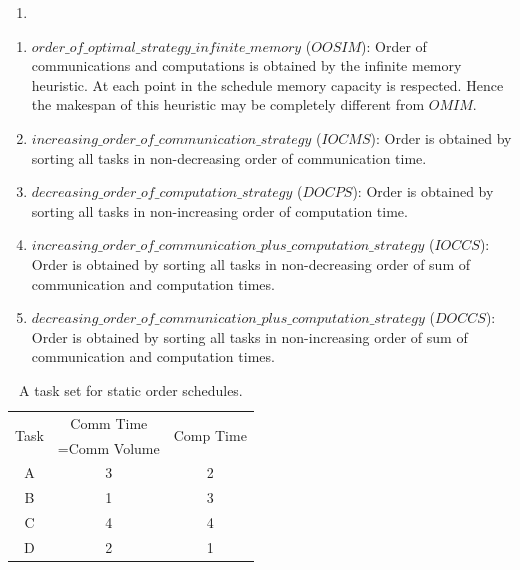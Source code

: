 \documentclass[sigconf]{acmart}
\begin{document}
	\begin{enumerate}[label=\roman*)]
		\item 
	\end{enumerate}
	\begin{enumerate}[label=\roman*)]
		\item $order\_of\_optimal\_strategy\_infinite\_memory $ ($OOSIM$): Order of communications and computations is obtained by the infinite memory heuristic. At each point in the schedule memory capacity is respected. Hence the makespan of this heuristic may be completely different from $OMIM$.
		
		\item $increasing\_order\_of\_communication\_strategy$ ($IOCMS$): Order is obtained by sorting all tasks in non-decreasing order of communication time. 
		
		\item $decreasing\_order\_of\_computation\_strategy$ ($DOCPS$): Order is obtained by sorting all tasks in non-increasing order of computation time. 
		\item $increasing\_order\_of\_communication\_plus\_computation\_strategy$ ($IOCCS$): Order is obtained by sorting all tasks in non-decreasing order of sum of communication and computation times.
		\item $decreasing\_order\_of\_communication\_plus\_computation\_strategy$ ($DOCCS$): Order is obtained by sorting all tasks in non-increasing order of sum of communication and computation times.
		
	\end{enumerate}
	\begin{table}[htb]
		\begin{center}
			
			\begin{tabular}{|c|c|c|}
				\hline
				\multirow{2}{*}{Task} & Comm Time & \multirow{2}{*}{Comp Time}\\ 
				&=Comm Volume& \\ \hline
				A & 3 & 2\\ \hline
				B & 1 & 3\\ \hline
				C & 4 & 4\\ \hline
				D & 2 & 1\\ \hline
			\end{tabular}
			\caption{\label{tab:staticOrderExample} A task set for static order schedules.}
		\end{center}
	\end{table}
	
\end{document}
